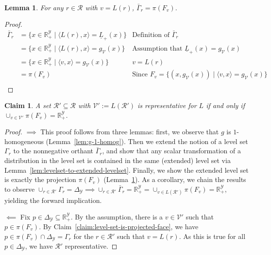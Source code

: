 \documentclass[11pt]{article}
\newcommand{\Comments}{1}
\newcommand{\mynote}[2]{\ifnum\Comments=1\textcolor{#1}{#2}\fi}
\newcommand{\raf}[1]{\mynote{darkgreen}{[RF: #1]}}
\newcommand{\reals}{\mathbb{R}}
\newcommand{\simplex}{\Delta_\Y}
\newcommand{\R}{\mathcal{R}}
\newcommand{\V}{\mathcal{V}}
\newcommand{\Y}{\mathcal{Y}}
\newcommand{\risk}[1]{\underline{#1}}
\newcommand{\inprod}[2]{\langle #1, #2 \rangle}%
\newtheorem{lemma}{Lemma}
\newtheorem{claim}{Claim}
\begin{document}
\begin{lemma}\label{lem:extended-levelset-equals-projected-face}
	For any $r\in \R$ with $v = L(r)$, $\bar \Gamma_r = \pi(F_v)$.  
\end{lemma}
\begin{proof}
	\begin{align*}
	\bar \Gamma_r
	&= \{x \in \reals^\Y_+ \mid \inprod{L(r)}{x} = \risk L_+(x)\} & \text{Definition of $\bar \Gamma_r$}\\
	&= \{x \in \reals^\Y_+ \mid \inprod{L(r)}{x} = g_\V(x)\} & \text{Assumption that $\risk L_+(x) = g_\V(x)$}\\
	&= \{x \in \reals^\Y_+ \mid \inprod{v}{x} = g_\V(x)\} & \text{$v = L(r)$}\\
	&= \pi(F_v) & \text{Since $F_v = \{(x,g_\V(x)) \mid \inprod{v}{x} = g_\V(x)\}$}\\
	\end{align*}
\end{proof}


\begin{claim}\label{claim:projected-faces-cover-RY-iff-representative}
	A set $\R' \subseteq \R$ with $\V' := L(\R')$ is representative for $L$ if and only if $\cup_{v \in \V'} \pi(F_v) = \reals^\Y_+$.  
\end{claim}
\begin{proof}
	$\implies$
	This proof follows from three lemmas: first, we observe that $g$ is $1$-homogeneous (Lemma~\ref{lem:g-1-homog}).
	Then we extend the notion of a level set $\Gamma_r$ to the nonnegative orthant $\bar \Gamma_r$, and show that any scalar transformation of a distribution in the level set is contained in the same (extended) level set via Lemma~\ref{lem:levelset-to-extended-levelset}.
	Finally, we show the extended level set is exactly the projection $\pi(F_v)$ (Lemma~\ref{lem:extended-levelset-equals-projected-face}).
	As a corollary, we chain the results to observe $\cup_{r \in \R'} \Gamma_r = \simplex \implies \cup_{r \in \R'} \bar \Gamma_r = \reals_+^\Y = \cup_{v \in L(\R')}\pi(F_v) = \reals^\Y_+$, yielding the forward implication.
	
	
	$\impliedby$
	Fix $p \in \simplex \subseteq \reals^\Y_+$.
	By the assumption, there is a $v \in \V'$ such that $p \in \pi(F_v)$.
	By Claim~\ref{claim:level-set-is-projected-face}, we have $p \in \pi(F_v) \cap \simplex = \Gamma_r$ for the $r \in \R'$ such that $v = L(r)$.
	As this is true for all $p \in \simplex$, we have $\R'$ representative.
	
	
\end{proof}
\end{document}
